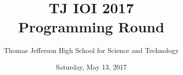 \documentclass[twoside]{article}
\begin{document}
\title{
    {\Huge TJ IOI 2017}\\
    {\huge Programming Round}
}

\author{
	\large Thomas Jefferson High School for Science and Technology
}
\date{\large Saturday, May 13, 2017}


\begin{titlepage}
    \maketitle
\end{titlepage}

\blankpage



\newpage

\tableofcontents
\newpage




\cleardoublepage



\cleardoublepage



\cleardoublepage



\cleardoublepage



\cleardoublepage



\cleardoublepage



\cleardoublepage



\cleardoublepage



\cleardoublepage

  

\cleardoublepage
\end{document}
